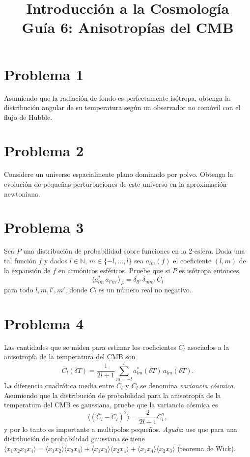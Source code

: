 \documentclass[11pt,a4paper]{article}
\title{\textbf{Introducción a la Cosmología \\ Guía 6: Anisotropías del CMB}}
\date{}
\begin{document}
\maketitle

\section*{Problema 1}
Asumiendo que la radiación de fondo es perfectamente isótropa, obtenga la distribución angular de su temperatura según un observador no comóvil con el flujo de Hubble.

\section*{Problema 2}
Considere un universo espacialmente plano dominado por polvo. Obtenga la evolución de pequeñas perturbaciones de este universo en la aproximación newtoniana.

\section*{Problema 3}
Sea $P$ una distribución de probabilidad sobre funciones en la 2-esfera. Dada una tal función $f$ y dados $l\in\mathbb{N}$, $m\in\{-l,\ldots,l\}$ sea $a_{lm}(f)$ el coeficiente $(l,m)$ de la expansión de $f$ en armónicos esféricos. Pruebe que si $P$ es isótropa entonces
\begin{equation}
  \langle a_{lm}^*\,a_{l'm'}\rangle_P=\delta_{ll'}\,\delta_{mm'}\,C_l
\end{equation}
para todo $l,m,l',m'$, donde $C_l$ es un número real no negativo.

\section*{Problema 4}
Las cantidades que se miden para estimar los coeficientes $C_l$ asociados a la anisotropía de la temperatura del CMB son
\begin{equation}
  \bar C_l(\delta T)=\frac{1}{2l+1}\sum_{m=-l}^{l}a_{lm}^*(\delta T)\,a_{lm}(\delta T).
\end{equation}
La diferencia cuadrática media entre $\bar C_l$ y $C_l$ se denomina \emph{variancia cósmica}. Asumiendo que la distribución de probabilidad para la anisotropía de la temperatura del CMB es gaussiana, pruebe que la variancia cósmica es
\begin{equation}
  \langle(\bar C_l-C_l)^2\rangle=\frac{2}{2l+1}C_l^2,
\end{equation}
y por lo tanto es importante a multipolos pequeños. \emph{Ayuda}: use que para una distribución de probabilidad gaussiana se tiene $\langle x_1x_2x_3x_4\rangle=\langle x_1x_2\rangle\langle x_3x_4\rangle+\langle x_1x_3\rangle\langle x_2x_4\rangle+\langle x_1x_4\rangle\langle x_2x_3\rangle$ (teorema de Wick).
\end{document}
